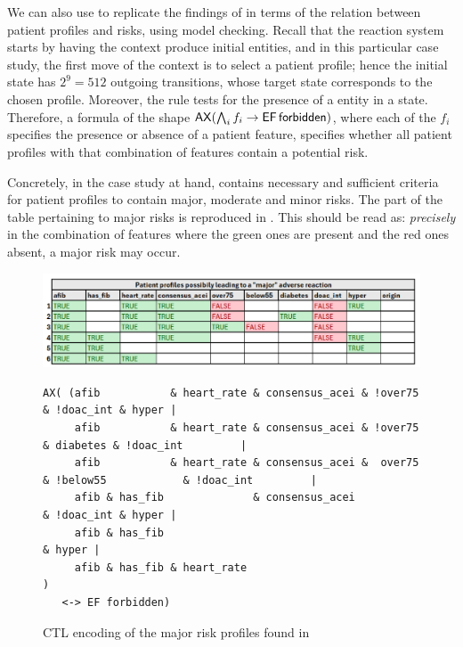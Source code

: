 \medskip\noindent We can also use \GROOVE to replicate the findings of  \cite[Fig.\ 6]{DBLP:conf/cmsb/BowlesBBFGM24} in terms of the relation between patient profiles and risks, using model checking. Recall that the reaction system starts by having the context produce initial entities, and in this particular case study, the first move of the context is to select a patient profile; hence the initial state has $2^9=512$ outgoing transitions, whose target state corresponds to the chosen profile. Moreover, the rule \forbidden tests for the presence of a \Forbidden entity in a state. Therefore, a formula of the shape
$\mathop{\mathsf{AX}}(\bigwedge_i f_i \rightarrow \mathop{\mathsf{EF}} {\text{\sffamily forbidden}})$, where each of the $f_i$ specifies the presence or absence of a patient feature, specifies whether all patient profiles with that combination of features contain a potential risk.

Concretely, in the case study at hand, \cite[Fig.~6]{DBLP:conf/cmsb/BowlesBBFGM24} contains necessary and sufficient criteria for patient profiles to contain major, moderate and minor risks. The part of the table pertaining to major risks is reproduced in . This should be read as: \emph{precisely} in the combination of features where the green ones are present and the red ones absent, a major risk may occur.
%
\begin{figure}
\centering
\includegraphics[scale=.4]{./figs/table-from-cmsb2024}\begin{lstlisting}[basicstyle=\ttfamily\small,xleftmargin=0cm]
AX( (afib           & heart_rate & consensus_acei & !over75                       & !doac_int & hyper |
     afib           & heart_rate & consensus_acei & !over75            & diabetes & !doac_int         |
     afib           & heart_rate & consensus_acei &  over75 & !below55            & !doac_int         |
     afib & has_fib              & consensus_acei                                 & !doac_int & hyper |
     afib & has_fib                                                                           & hyper |
     afib & has_fib & heart_rate                                                                      )
   <-> EF forbidden)
\end{lstlisting}
\caption{CTL encoding of the major risk profiles found in \cite[Fig.~6]{DBLP:conf/cmsb/BowlesBBFGM24}}
\label{fig:table-from-cmsb2024}
\end{figure}

